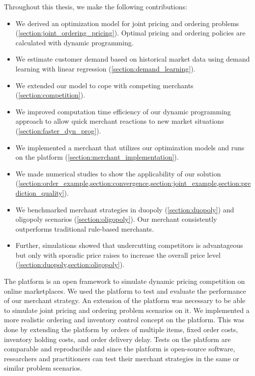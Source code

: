 Throughout this thesis, we make the following contributions:
\begin{itemize}
	\item We derived an optimization model for joint pricing and ordering problems (\cref{section:joint_ordering_pricing}). Optimal pricing and ordering policies are calculated with dynamic programming.
	\item We estimate customer demand based on historical market data using demand learning with linear regression (\cref{section:demand_learning}).
	\item We extended our model to cope with competing merchants (\cref{section:competition}).
	\item We improved computation time efficiency of our dynamic programming approach to allow quick merchant reactions to new market situations (\cref{section:faster_dyn_prog}).
	\item We implemented a merchant that utilizes our optimization models and runs on the  \pricewars platform (\cref{section:merchant_implementation}).
	\item We made numerical studies to show the applicability of our solution (\cref{section:order_example,section:convergence,section:joint_example,section:prediction_quality}).
	\item We benchmarked merchant strategies in duopoly (\cref{section:duopoly}) and oligopoly scenarios (\cref{section:oligopoly}). Our merchant consistently outperforms traditional rule-based merchants.
	\item Further, simulations showed that undercutting competitors is advantageous but only with sporadic price raises to increase the overall price level (\cref{section:duopoly,section:oligopoly}).
\end{itemize}

The \pricewars platform is an open framework to simulate dynamic pricing competition on online marketplaces.
We used the platform to test and evaluate the performance of our merchant strategy.
An extension of the platform was necessary to be able to simulate joint pricing and ordering problem scenarios on it.
We implemented a more realistic ordering and inventory control concept on the \pricewars platform.
This was done by extending the platform by orders of multiple items, fixed order costs, inventory holding costs, and order delivery delay.
Tests on the platform are comparable and reproducible and since the platform is open-source software, researchers and practitioners can test their merchant strategies in the same or similar problem scenarios.




